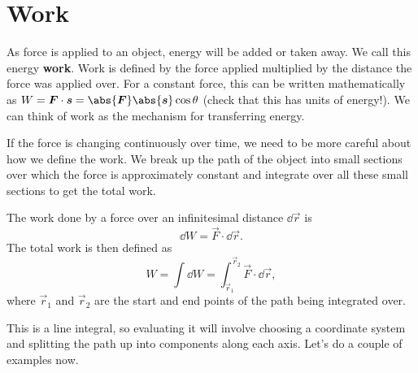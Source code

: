 \documentclass[../classical_mechanics.tex]{subfiles}
\begin{document}
    \section{Work}\label{sec:work}
        As force is applied to an object, energy will be added or taken away.
        We call this energy \textbf{work}.
        Work is defined by the force applied multiplied by the distance the force was applied over.
        For a constant force, this can be written mathematically as $W=\vec{F}\cdot\vec{s}=\abs{\vec{F}}\abs{\vec{s}}\cos\theta$ (check that this has units of energy!).
        We can think of work as the mechanism for transferring energy.
        
        If the force is changing continuously over time, we need to be more careful about how we define the work.
        We break up the path of the object into small sections over which the force is approximately constant and integrate over all these small sections to get the total work.
        \begin{definition}
            The work done by a force over an infinitesimal distance $\dd{\vec{r}}$ is
            \begin{equation}
                \dd{W}=\vec{F}\cdot\dd{\vec{r}}.
            \end{equation}
            The total work is then defined as
            \begin{equation}\label{eq:work-line-integral}
                W=\int\dd{W}=\int_{\vec{r}_1}^{\vec{r}_2}\vec{F}\cdot\dd{\vec{r}},
            \end{equation}
            where $\vec{r}_1$ and $\vec{r}_2$ are the start and end points of the path being integrated over.
        \end{definition}
        This is a line integral, so evaluating it will involve choosing a coordinate system and splitting the path up into components along each axis.
        Let's do a couple of examples now.
        
\end{document}
